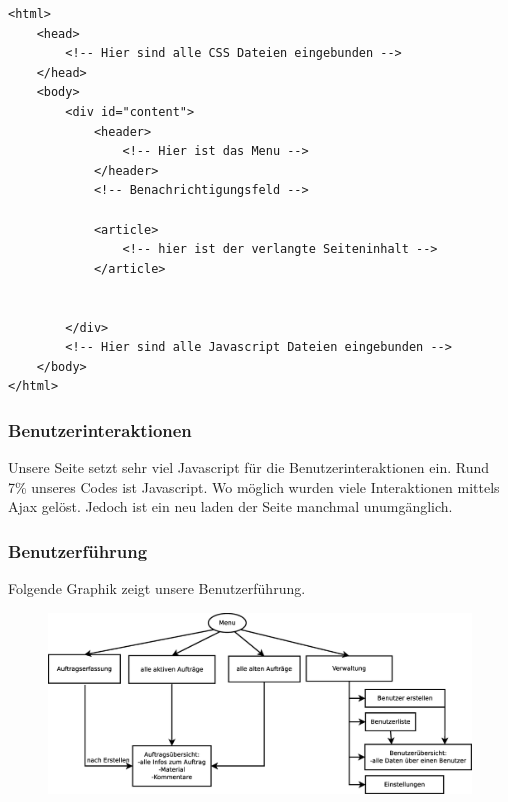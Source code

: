 \documentclass[ngerman, 12pt, pdftex]{scrartcl}[2006/07/30]
\begin{document}
	\lstset{language=html}
\begin{lstlisting}
<html>
	<head>
		<!-- Hier sind alle CSS Dateien eingebunden -->
	</head>
	<body>
		<div id="content">
			<header>
				<!-- Hier ist das Menu -->
			</header>
			<!-- Benachrichtigungsfeld -->
			
			<article>
				<!-- hier ist der verlangte Seiteninhalt -->
			</article>
					
					
		</div>
		<!-- Hier sind alle Javascript Dateien eingebunden -->
	</body>
</html>
	\end{lstlisting}
	
	\subsubsection{Benutzerinteraktionen}
	Unsere Seite setzt sehr viel Javascript für die Benutzerinteraktionen ein. 
	Rund 7\% unseres Codes ist Javascript. Wo möglich wurden viele Interaktionen mittels Ajax gelöst.
	Jedoch ist ein neu laden der Seite manchmal unumgänglich. 
	
	
	
	\subsubsection{Benutzerführung}
	Folgende Graphik zeigt unsere Benutzerführung.
	\begin{figure}[h!]
 \includegraphics[width=\textwidth]{navigation.eps}
\end{figure}

\end{document}
